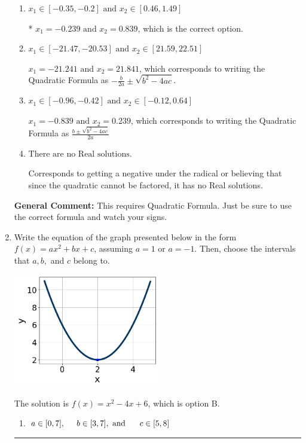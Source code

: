 \documentclass{extbook}[14pt]
\newcommand{\litem}[1]{\item #1

\rule{\textwidth}{0.4pt}}
\begin{document}
\begin{enumerate}
{\begin{enumerate}[label=\Alph*.]
 $x_1 = -4.770 \text{ and } x_2 = 16.770$, which corresponds to using the Quadratic Formula with $a=1$
\item \( x_1 \in [-0.35, -0.2] \text{ and } x_2 \in [0.46, 1.49] \)

* $x_1 = -0.239 \text{ and } x_2 = 0.839$, which is the correct option.
\item \( x_1 \in [-21.47, -20.53] \text{ and } x_2 \in [21.59, 22.51] \)

 $x_1 = -21.241 \text{ and } x_2 = 21.841$, which corresponds to writing the Quadratic Formula as $-\frac{b}{2a} \pm \sqrt{b^2 - 4ac}$.
\item \( x_1 \in [-0.96, -0.42] \text{ and } x_2 \in [-0.12, 0.64] \)

 $x_1 = -0.839 \text{ and } x_2 = 0.239$, which corresponds to writing the Quadratic Formula as $\frac{b \pm \sqrt{b^2 - 4ac}}{2a}$
\item \( \text{There are no Real solutions.} \)

Corresponds to getting a negative under the radical or believing that since the quadratic cannot be factored, it has no Real solutions.
\end{enumerate}

\textbf{General Comment:} This requires Quadratic Formula. Just be sure to use the correct formula and watch your signs.
}
\litem{
Write the equation of the graph presented below in the form $f(x)=ax^2+bx+c$, assuming  $a=1$ or $a=-1$. Then, choose the intervals that $a, b,$ and $c$ belong to.

\begin{center}
    \includegraphics[width=0.5\textwidth]{../Figures/quadraticGraphToEquationC.png}
\end{center}


The solution is \( f(x) = x^{2} -4 x + 6 \), which is option B.\begin{enumerate}[label=\Alph*.]
\item \( a \in [0, 7], \hspace*{5mm} b \in [3, 7], \text{ and } \hspace*{5mm} c \in [5, 8] \)


\end{enumerate}}
\end{enumerate}
\end{document}

